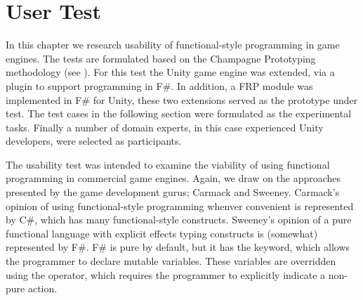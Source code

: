 \chapter{User Test}
In this chapter we research usability of functional-style programming in game engines. The tests are formulated based on the Champagne Prototyping methodology (see ). For this test the Unity game engine was extended, via a plugin to support programming in F\#\cite{fsharp2019plugin}. In addition, a \gls{FRP} module was implemented in F\# for Unity, these two extensions served as the prototype under test. The test cases in the following section were formulated as the experimental tasks. Finally a number of domain experts, in this case experienced Unity developers, were selected as participants. 

The usability test was intended to examine the viability of using functional programming in commercial game engines. Again, we draw on the approaches presented by the game development gurus; Carmack and Sweeney. Carmack's opinion of using functional-style programming whenver convenient is represented by C\#, which has many functional-style constructs. Sweeney's opinion of a pure functional language with explicit effects typing constructs is (somewhat) represented by F\#. F\# is pure by default, but it has the  keyword, which allows the programmer to declare mutable variables. These variables are overridden using the \ttt{\textless-} operator, which requires the programmer to explicitly indicate a non-pure action.





